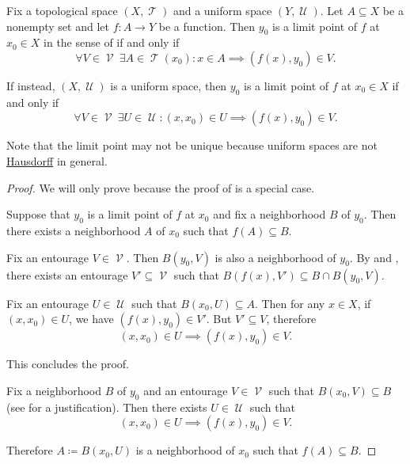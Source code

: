 \begin{proposition}\label{thm:uniform_space_local_convergence}
  Fix a topological space \( (X, \mscrT) \) and a uniform space \( (Y, \mscrU) \). Let \( A \subseteq X \) be a nonempty set and let \( f: A \to Y \) be a function. Then \( y_0 \) is a limit point of \( f \) at \( x_0 \in X \) in the sense of  if and only if
  \begin{equation}\label{thm:uniform_space_local_convergence/topological_source}
    \forall V \in \mscrV \ \exists A \in \mscrT(x_0) : x \in A \implies (f(x), y_0) \in V.
  \end{equation}

  If instead, \( (X, \mscrU) \) is a uniform space, then \( y_0 \) is a limit point of \( f \) at \( x_0 \in X \) if and only if
  \begin{equation}\label{thm:uniform_space_local_convergence/uniform_source}
    \forall V \in \mscrV \ \exists U \in \mscrU : (x, x_0) \in U \implies (f(x), y_0) \in V.
  \end{equation}

  Note that the limit point may not be unique because uniform spaces are not \hyperref[def:separation_axioms/T2]{Hausdorff} in general.
\end{proposition}
\begin{proof}
  We will only prove  because the proof of  is a special case.

  \SufficiencySubProof Suppose that \( y_0 \) is a limit point of \( f \) at \( x_0 \) and fix a neighborhood \( B \) of \( y_0 \). Then there exists a neighborhood \( A \) of \( x_0 \) such that \( f(A) \subseteq B \).

  Fix an entourage \( V \in \mscrV \). Then \( B(y_0, V) \) is also a neighborhood of \( y_0 \). By  and , there exists an entourage \( V' \subseteq \mscrV \) such that \( B(f(x), V') \subseteq B \cap B(y_0, V) \).

  Fix an entourage \( U \in \mscrU \) such that \( B(x_0, U) \subseteq A \). Then for any \( x \in X \), if \( (x, x_0) \in U \), we have \( (f(x), y_0) \in V' \). But \( V' \subseteq V \), therefore
  \begin{equation*}
    (x, x_0) \in U \implies (f(x), y_0) \in V.
  \end{equation*}

  This concludes the proof.

  \NecessitySubProof Fix a neighborhood \( B \) of \( y_0 \) and an entourage \( V \in \mscrV \) such that \( B(x_0, V) \subseteq B \) (see  for a justification). Then there exists \( U \in \mscrU \) such that
  \begin{equation*}
    (x, x_0) \in U \implies (f(x), y_0) \in V.
  \end{equation*}

  Therefore \( A \coloneqq B(x_0, U) \) is a neighborhood of \( x_0 \) such that \( f(A) \subseteq B \).
\end{proof}

